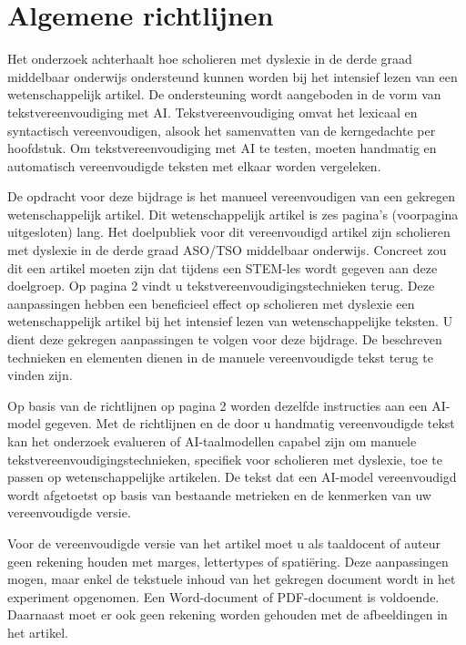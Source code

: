 \chapter{Algemene richtlijnen}
	
Het onderzoek achterhaalt hoe scholieren met dyslexie in de derde graad middelbaar onderwijs ondersteund kunnen worden bij het intensief lezen van een wetenschappelijk artikel. De ondersteuning wordt aangeboden in de vorm van tekstvereenvoudiging met AI. Tekstvereenvoudiging omvat het lexicaal en syntactisch vereenvoudigen, alsook het samenvatten van de kerngedachte per hoofdstuk. Om tekstvereenvoudiging met AI te testen, moeten handmatig en automatisch vereenvoudigde teksten met elkaar worden vergeleken. 
	
	\medspace
	
De opdracht voor deze bijdrage is het manueel vereenvoudigen van een gekregen wetenschappelijk artikel. Dit wetenschappelijk artikel is zes pagina's (voorpagina uitgesloten) lang. Het doelpubliek voor dit vereenvoudigd artikel zijn scholieren met dyslexie in de derde graad ASO/TSO middelbaar onderwijs. Concreet zou dit een artikel moeten zijn dat tijdens een STEM-les wordt gegeven aan deze doelgroep. Op pagina 2 vindt u tekstvereenvoudigingstechnieken terug. Deze aanpassingen hebben een beneficieel effect op scholieren met dyslexie een wetenschappelijk artikel bij het intensief lezen van wetenschappelijke teksten. U dient deze gekregen aanpassingen te volgen voor deze bijdrage. De beschreven technieken en elementen dienen in de manuele vereenvoudigde tekst terug te vinden zijn. 
	
	\medspace
	
Op basis van de richtlijnen op pagina 2 worden dezelfde instructies aan een AI-model gegeven. Met de richtlijnen en de door u handmatig vereenvoudigde tekst kan het onderzoek evalueren of AI-taalmodellen capabel zijn om manuele tekstvereenvoudigingstechnieken, specifiek voor scholieren met dyslexie, toe te passen op wetenschappelijke artikelen. De tekst dat een AI-model vereenvoudigd wordt afgetoetst op basis van bestaande metrieken en de kenmerken van uw vereenvoudigde versie. %
	
	\medspace
	
Voor de vereenvoudigde versie van het artikel moet u als taaldocent of auteur geen rekening houden met marges, lettertypes of spatiëring. Deze aanpassingen mogen, maar enkel de tekstuele inhoud van het gekregen document wordt in het experiment opgenomen. Een Word-document of PDF-document is voldoende. Daarnaast moet er ook geen rekening worden gehouden met de afbeeldingen in het artikel.  
	
